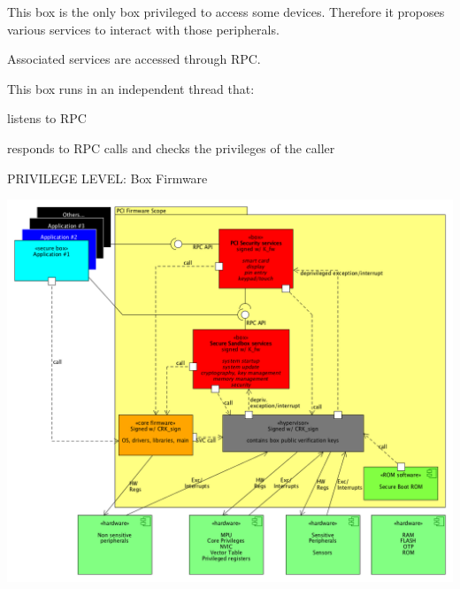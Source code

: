 This box is the only box privileged to access some devices. Therefore it proposes various services to interact with those peripherals.

Associated services are accessed through R\+PC.

This box runs in an independent thread that\+:
\begin{DoxyItemize}
\item listens to R\+PC
\item responds to R\+PC calls and checks the privileges of the caller
\end{DoxyItemize}

P\+R\+I\+V\+I\+L\+E\+GE L\+E\+V\+EL\+: Box Firmware


\begin{DoxyImageNoCaption}
  \mbox{\includegraphics[width=\textwidth,height=\textheight/2,keepaspectratio=true]{pci_cortex.png}}
\end{DoxyImageNoCaption}
  